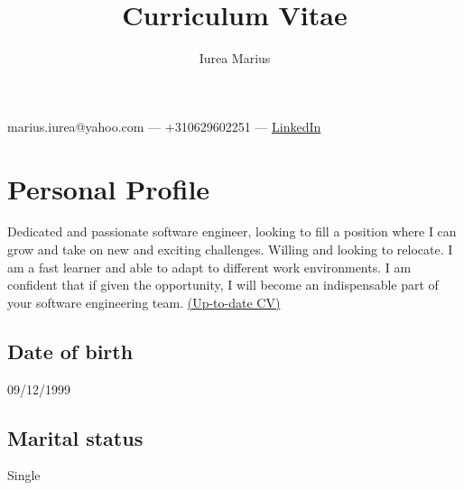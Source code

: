 \documentclass[a4paper,hidelinks,11pt]{article}
\begin{document}
\title{Curriculum Vitae}
\author{Iurea Marius}
\renewcommand{\maketitle}
{\begin{center}
        {\huge\bfseries
        \thetitle

        \theauthor}

        marius.iurea@yahoo.com --- +310629602251 --- \href{https://www.linkedin.com/in/marius-iurea-49b7021b5/}{LinkedIn}

        \end{center}
}



\maketitle

\section{Personal Profile}
Dedicated and passionate software engineer, looking to fill a position where I can grow and take on new and exciting
challenges. Willing and looking to relocate. I am a fast learner and able to adapt to different work environments. I am confident that if given the opportunity, I will become an indispensable part of your software engineering team. \href{https://github.com/IureaMarius/CV}{(Up-to-date CV)}

\subsection{Date of birth} 09/12/1999
\subsection{Marital status} Single
\end{document}
